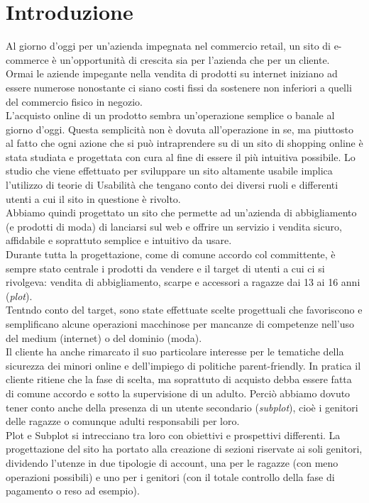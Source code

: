 \documentclass[12pt,a4paper]{report}
\begin{document}
\chapter{Introduzione}
Al giorno d'oggi per un'azienda impegnata nel commercio retail, un sito di e-commerce è un'opportunità di crescita sia per l'azienda che per un cliente.\\
Ormai le aziende impegante nella vendita di prodotti su internet iniziano ad essere numerose nonostante ci siano costi fissi da sostenere non inferiori a quelli del commercio fisico in negozio.\\
L'acquisto online di un prodotto sembra un'operazione semplice o banale al giorno d'oggi. Questa semplicità non è dovuta all'operazione in se, ma piuttosto al fatto che ogni azione che si può intraprendere su di un sito di shopping online è stata studiata e progettata con cura al fine di essere il più intuitiva possibile. Lo studio che viene effettuato per sviluppare un sito altamente usabile implica l'utilizzo di teorie di Usabilità che tengano conto dei diversi ruoli e differenti utenti a cui il sito in questione è rivolto.\\
Abbiamo quindi progettato un sito che permette ad un'azienda di abbigliamento (e prodotti di moda) di lanciarsi sul web e offrire un servizio i vendita sicuro, affidabile e soprattuto semplice e intuitivo da usare.\\
Durante tutta la progettazione, come di comune accordo col committente, è sempre stato centrale i prodotti da vendere e il target di utenti a cui ci si rivolgeva: vendita di abbigliamento, scarpe e accessori a ragazze dai 13 ai 16 anni (\textit{plot}).\\
Tentndo conto del target, sono state effettuate scelte progettuali che favoriscono e semplificano alcune operazioni macchinose per mancanze di competenze nell'uso del medium (internet) o del dominio (moda).\\
Il cliente ha anche rimarcato il suo particolare interesse per le tematiche della sicurezza dei minori online e dell'impiego di politiche parent-friendly. In pratica il cliente ritiene che la fase di scelta, ma soprattuto di acquisto debba essere fatta di comune accordo e sotto la supervisione di un adulto. Perciò abbiamo dovuto tener conto anche della presenza di un utente secondario (\textit{subplot}), cioè i genitori delle ragazze o comunque adulti responsabili per loro.\\
Plot e Subplot si intrecciano tra loro con obiettivi e prospettivi differenti. La progettazione del sito ha portato alla creazione di sezioni riservate ai soli genitori, dividendo l'utenze in due tipologie di account, una per le ragazze (con meno operazioni possibili) e uno per i genitori (con il totale controllo della fase di pagamento o reso ad esempio).\\
\end{document}

